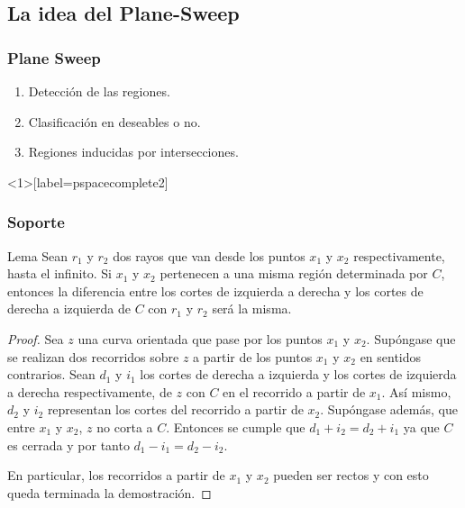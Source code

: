 \documentclass[notes=show]{beamer}
\begin{document}
\subsection{La idea del Plane-Sweep}
\begin{frame}
\frametitle{Plane Sweep}
\begin{enumerate}
	\item<1-| alert@1>Detecci\'on de las regiones.
	\item<2-| alert@2>Clasificaci\'on en deseables o no.  
	\item<3-| alert@3>Regiones inducidas por intersecciones.	
\end{enumerate}
\transboxin[duration=0.3]
\end{frame}
\begin{frame}
<1>[label=pspacecomplete2] 
\frametitle{Soporte}

\begin{block}{Lema}
\footnotesize{Sean $r_{1}$ y $r_2$ dos rayos que van desde los puntos $x_1$ y $x_2$ respectivamente, hasta el infinito. Si $x_1$ y $x_2$ pertenecen a una misma regi\'on determinada por $C$, entonces la diferencia entre los cortes de izquierda a derecha y los cortes de derecha a izquierda de $C$ con $r_1$ y $r_2$ ser\'a la misma.}\end{block}

\begin{overprint}
\hyperlink{pspacecomplete2<2>}{}


\begin{proof}
\footnotesize{ Sea $z$ una curva orientada que pase por los puntos $x_1$ y $x_2$. Sup\'ongase que se realizan dos recorridos sobre $z$ a partir de los puntos $x_1$ y $x_2$ en sentidos contrarios. Sean $d_1$ y $i_1$ los cortes de derecha a izquierda y los cortes de izquierda a derecha respectivamente, de $z$ con $C$ en el recorrido a partir de $x_1$. As\'i mismo, $d_2$ y $i_2$ representan los cortes del recorrido a partir de $x_2$. Sup\'ongase adem\'as, que entre $x_1$ y $x_2$, $z$ no corta a $C$. Entonces se cumple que $d_1 + i_2 = d_2 + i_1$ ya que $C$ es cerrada y por tanto $d_1 - i_1 = d_2 - i_2$. \newline

En particular, los recorridos a partir de $x_1$ y $x_2$ pueden ser rectos y con esto queda terminada la demostraci\'on.}
\end{proof}

\end{overprint}
\transdissolve[duration=0.4]
\end{frame}
\end{document}
